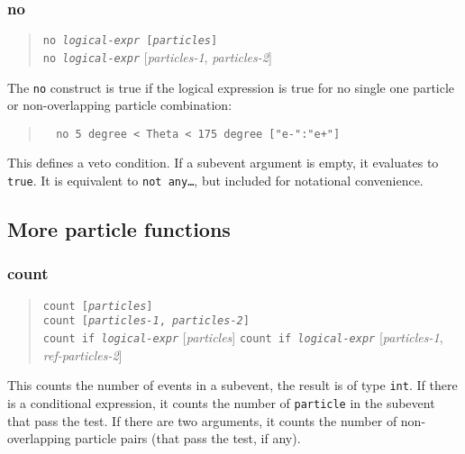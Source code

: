 \documentclass[12pt]{book}
\newcommand{\ttt}[1]{\texttt{#1}}
\begin{document}
\subsubsection{no}
\begin{quote}
\begin{footnotesize}
  \ttt{no \textit{logical-expr} [\textit{particles}]} \\
  \ttt{no \textit{logical-expr}} [\textit{particles-1}, \textit{particles-2}]
\end{footnotesize}
\end{quote}
The \ttt{no} construct is true if the logical expression is true for no single
one particle or non-overlapping particle combination:
\begin{quote}
\begin{footnotesize}
\begin{verbatim}
  no 5 degree < Theta < 175 degree ["e-":"e+"]
\end{verbatim}
\end{footnotesize}
\end{quote}
This defines a veto condition.  If a subevent argument is empty, it
evaluates to \ttt{true}.  It is equivalent to \ttt{not any\ldots}, but
included for notational convenience.


\subsection{More particle functions}

\subsubsection{count}
\begin{quote}
\begin{footnotesize}
  \ttt{count [\textit{particles}]} \\
  \ttt{count [\textit{particles-1}, \textit{particles-2}]} \\
  \ttt{count if \textit{logical-expr}} [\textit{particles}]
  \ttt{count if \textit{logical-expr}} [\textit{particles-1}, \textit{ref-particles-2}]
\end{footnotesize}
\end{quote}
This counts the number of events in a subevent, the result is of type
\ttt{int}.  If there is a conditional expression, it counts the number of
\ttt{particle} in the subevent that pass the test.   If there are two
arguments, it counts the number of non-overlapping particle pairs (that pass
the test, if any).
\end{document}
